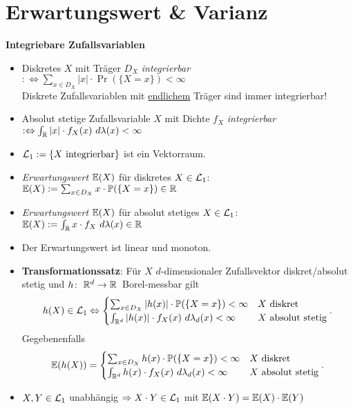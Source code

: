 \section{Erwartungswert \& Varianz}

\textbf{Integriebare Zufallsvariablen}
\begin{itemize}
\item Diskretes $X$ mit Träger $D_X$ \textit{integrierbar}
  $:\Leftrightarrow \sum_{x \in D_X} |x| \cdot \Pr(\{X=x\}) < \infty$ \\
  Diskrete Zufallsvariablen mit \underline{endlichem} Träger sind immer
  integrierbar!

\item  Absolut stetige Zufallsvariable $X$ mit Dichte $f_X$ \textit{integrierbar}
  \mbox{$:\Leftrightarrow \int_{\mathbb{R}} |x| \cdot f_X(x)~d\lambda(x) < \infty$}

\item $\mathcal{L}_1 := \{X \text{ integrierbar}\}$ ist ein Vektorraum.

\item \textit{Erwartungswert $\mathbb{E}(X)$} für diskretes $X\in\mathcal{L}_1$:
  $\mathbb{E}(X) := \sum_{x \in D_X} x \cdot \mathbb{P}(\{X=x\}) \in\mathbb{R}$

\item \textit{Erwartungswert $\mathbb{E}(X)$} für absolut stetiges $X\in\mathcal{L}_1$:
  $\mathbb{E}(X) := \int_{\mathbb{R}} x\cdot f_X~d\lambda(x) \in\mathbb{R}$

\item Der Erwartungswert ist linear und monoton.

\item \textbf{Transformationssatz}: Für $X$ $d$-dimensionaler Zufallsvektor
  diskret/absolut stetig und \mbox{$h\!:\ \mathbb{R}^d\to\mathbb{R}$ Borel-messbar} gilt
  \[
    h(X)\in\mathcal{L}_1 \Leftrightarrow
    \begin{cases}
    \sum_{x \in D_X} |h(x)| \cdot \mathbb{P}(\{X=x\}) < \infty      & X \text{ diskret}  \\
    \int_{\mathbb{R}^d} |h(x)| \cdot f_X(x)~d\lambda_d(x) < \infty   & X \text{ absolut stetig}
    \end{cases}.
  \]
  Gegebenenfalls
  \[
  	\mathbb{E}(h(X)) =
    \begin{cases}
    \sum_{x \in D_X} h(x) \cdot \mathbb{P}(\{X=x\}) < \infty			& X \text{ diskret} \\
    \int_{\mathbb{R}^d} h(x) \cdot f_X(x)~d\lambda_d(x) < \infty  & X \text{ absolut stetig}
    \end{cases}.
  \]

\item $X,Y\in\mathcal{L}_1$ unabhängig
  $\Rightarrow X \cdot Y \in\mathcal{L}_1$ mit $\mathbb{E}(X \cdot Y) = \mathbb{E}(X) \cdot \mathbb{E}(Y)$
  \marginpar{\vspace{-2.2em}\begin{equation}\label{unabhaengig_e}\end{equation}}
\end{itemize}
\hspace{3em}

